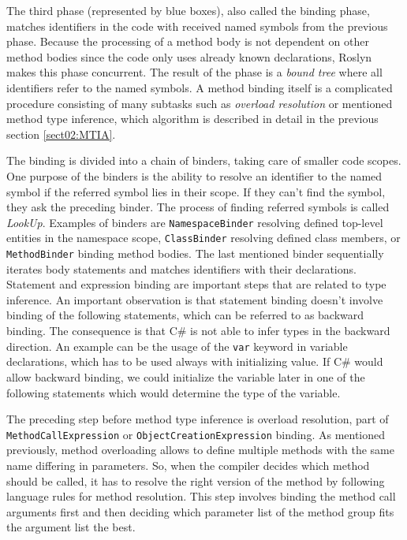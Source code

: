 The third phase (represented by blue boxes), also called the binding phase, matches identifiers in the code with received named symbols from the previous phase. 
Because the processing of a method body is not dependent on other method bodies since the code only uses already known declarations, Roslyn makes this phase concurrent. 
The result of the phase is a \emph{bound tree} where all identifiers refer to the named symbols. 
A method binding itself is a complicated procedure consisting of many subtasks such as \emph{overload resolution} or mentioned method type inference, which algorithm is described in detail in the previous section \ref{sect02:MTIA}.
\par
The binding is divided into a chain of binders, taking care of smaller code scopes. 
One purpose of the binders is the ability to resolve an identifier to the named symbol if the referred symbol lies in their scope. 
If they can’t find the symbol, they ask the preceding binder. 
The process of finding referred symbols is called \emph{LookUp}. 
Examples of binders are \texttt{NamespaceBinder} resolving defined top-level entities in the namespace scope, \texttt{ClassBinder} resolving defined class members, or \texttt{MethodBinder} binding method bodies. 
The last mentioned binder sequentially iterates body statements and matches identifiers with their declarations. 
Statement and expression binding are important steps that are related to type inference.
An important observation is that statement binding doesn’t involve binding of the following statements, which can be referred to as backward binding. 
The consequence is that C\# is not able to infer types in the backward direction. 
An example can be the usage of the \texttt{var} keyword in variable declarations, which has to be used always with initializing value. 
If C\# would allow backward binding, we could initialize the variable later in one of the following statements which would determine the type of the variable.
\par
The preceding step before method type inference is overload resolution, part of \texttt{MethodCallExpression} or \texttt{ObjectCreationExpression} binding. 
As mentioned previously, method overloading allows to define multiple methods with the same name differing in parameters. 
So, when the compiler decides which method should be called, it has to resolve the right version of the method by following language rules for method resolution. 
This step involves binding the method call arguments first and then deciding which parameter list of the method group fits the argument list the best. 
